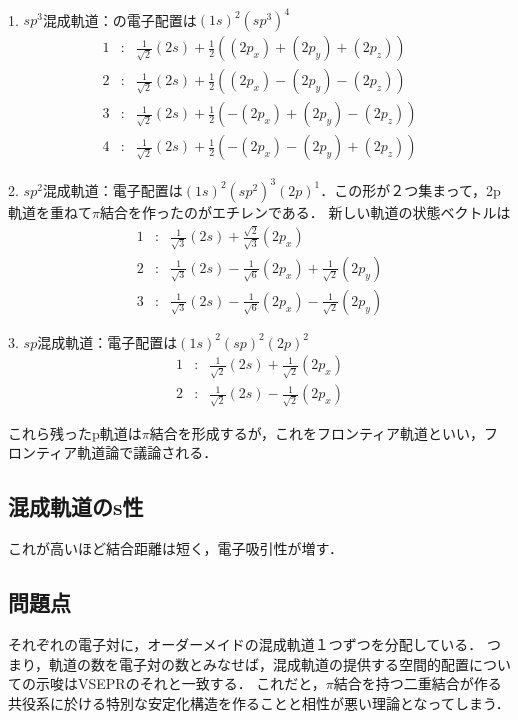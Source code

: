 \documentclass[uplatex, 12pt, dvipdfmx]{jsreport}
\begin{document}
\begin{example}　

    1. $sp^3$混成軌道：の電子配置は$(1s)^2(sp^3)^4$
    \begin{eqnarray*}
        1&:& \frac{1}{\sqrt{2}}(2s)+\frac{1}{2}((2p_x)+(2p_y)+(2p_z)) \\
        2&:& \frac{1}{\sqrt{2}}(2s)+\frac{1}{2}((2p_x)-(2p_y)-(2p_z))\\
        3&:& \frac{1}{\sqrt{2}}(2s)+\frac{1}{2}(-(2p_x)+(2p_y)-(2p_z))\\
        4&:& \frac{1}{\sqrt{2}}(2s)+\frac{1}{2}(-(2p_x)-(2p_y)+(2p_z))
    \end{eqnarray*}

    2. $sp^2$混成軌道：電子配置は$(1s)^2(sp^2)^3(2p)^1$．この形が２つ集まって，2p軌道を重ねて$\pi$結合を作ったのがエチレンである．
    新しい軌道の状態ベクトルは\begin{eqnarray*}
        1&:& \frac{1}{\sqrt{3}}(2s)+\frac{\sqrt{2}}{\sqrt{3}}(2p_x) \\
        2&:& \frac{1}{\sqrt{3}}(2s)-\frac{1}{\sqrt{6}}(2p_x)+\frac{1}{\sqrt{2}}(2p_y)\\
        3&:& \frac{1}{\sqrt{3}}(2s)-\frac{1}{\sqrt{6}}(2p_x)-\frac{1}{\sqrt{2}}(2p_y)
    \end{eqnarray*}
    
    3. $sp$混成軌道：電子配置は$(1s)^2(sp)^2(2p)^2$
    \begin{eqnarray*}
        1&:& \frac{1}{\sqrt{2}}(2s)+\frac{1}{\sqrt{2}}(2p_x) \\
        2&:& \frac{1}{\sqrt{2}}(2s)-\frac{1}{\sqrt{2}}(2p_x)
    \end{eqnarray*}
\end{example}
これら残ったp軌道は$\pi$結合を形成するが，これをフロンティア軌道といい，フロンティア軌道論で議論される．

\subsection*{混成軌道のs性}
これが高いほど結合距離は短く，電子吸引性が増す．

\subsection*{問題点}
それぞれの電子対に，オーダーメイドの混成軌道１つずつを分配している．
つまり，軌道の数を電子対の数とみなせば，混成軌道の提供する空間的配置についての示唆はVSEPRのそれと一致する．
これだと，$\pi$結合を持つ二重結合が作る共役系に於ける特別な安定化構造を作ることと相性が悪い理論となってしまう．
\end{document}
